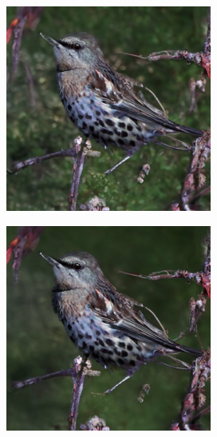 \documentclass{article}
\begin{document}
\begin{figure}
\begin{subfigure}[b]{0.19\linewidth}
    \end{subfigure}
    \begin{subfigure}[b]{0.19\linewidth}
    \includegraphics[width=\linewidth]{figures/imagenet256/solver_samples/imagenet256_fm_ot_04_20.png}
    \end{subfigure}
    \begin{subfigure}[b]{0.19\linewidth}
    \includegraphics[width=\linewidth]{figures/imagenet256/solver_samples/imagenet256_fm_ot_04_30.png}

\end{subfigure}
\end{figure}
\end{document}
